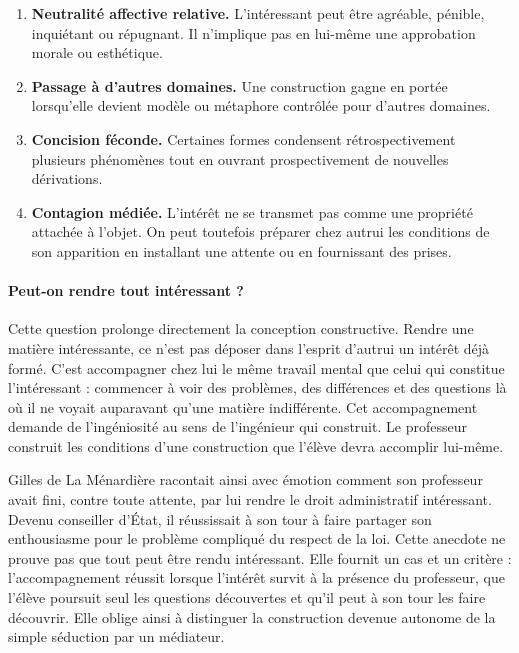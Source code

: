 \documentclass[11pt,a4paper]{article}
\begin{document}
\begin{enumerate}[resume]
  \item \textbf{Neutralité affective relative.} L'intéressant peut être
        agréable, pénible, inquiétant ou répugnant. Il n'implique pas en
        lui-même une approbation morale ou esthétique.
  \item \textbf{Passage à d'autres domaines.} Une construction gagne en portée
        lorsqu'elle devient modèle ou métaphore contrôlée pour d'autres
        domaines.
  \item \textbf{Concision féconde.} Certaines formes condensent
        rétrospectivement plusieurs phénomènes tout en ouvrant prospectivement
        de nouvelles dérivations.
  \item \textbf{Contagion médiée.} L'intérêt ne se transmet pas comme une
        propriété attachée à l'objet. On peut toutefois préparer chez autrui les
        conditions de son apparition en installant une attente ou en fournissant
        des prises.
\end{enumerate}

\paragraph{Peut-on rendre tout intéressant ?}

Cette question prolonge directement la conception constructive. Rendre une
matière intéressante, ce n'est pas déposer dans l'esprit d'autrui un intérêt
déjà formé. C'est accompagner chez lui le même travail mental que celui qui
constitue l'intéressant : commencer à voir des problèmes, des différences et
des questions là où il ne voyait auparavant qu'une matière indifférente. Cet
accompagnement demande de l'ingéniosité au sens de l'ingénieur qui construit.
Le professeur construit les conditions d'une construction que l'élève devra
accomplir lui-même.

Gilles de La Ménardière racontait ainsi avec émotion comment son professeur
avait fini, contre toute attente, par lui rendre le droit administratif
intéressant. Devenu conseiller d'État, il réussissait à son tour à faire
partager son enthousiasme pour le problème compliqué du respect de la loi.
Cette anecdote ne prouve pas que tout peut être rendu intéressant. Elle fournit
un cas et un critère : l'accompagnement réussit lorsque l'intérêt survit à la
présence du professeur, que l'élève poursuit seul les questions découvertes et
qu'il peut à son tour les faire découvrir. Elle oblige ainsi à distinguer la
construction devenue autonome de la simple séduction par un médiateur.
\end{document}
